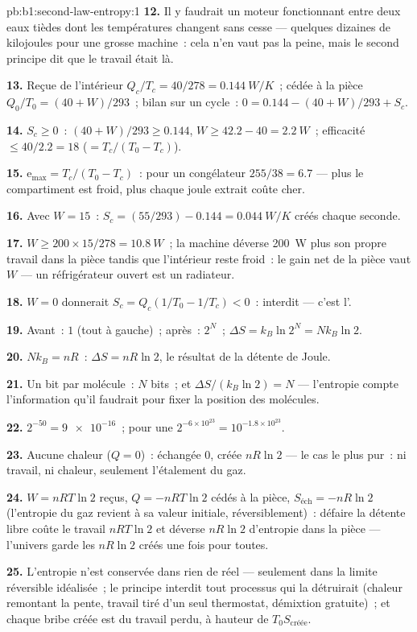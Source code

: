 \begin{solution}{pb:b1:second-law-entropy:1}
\textbf{12.} Il y faudrait un moteur fonctionnant entre deux eaux tièdes dont
les températures changent sans cesse --- quelques dizaines de kilojoules pour
une grosse machine~: cela n'en vaut pas la peine, mais le second principe dit
que le travail était là.

\textbf{13.} Reçue de l'intérieur $Q_c/T_c = 40/278 = \qty{0.144}{W/K}$~;
cédée à la pièce $Q_0/T_0 = (40 + W)/293$~; bilan sur un cycle~:
$0 = 0.144 - (40 + W)/293 + S_c$.

\textbf{14.} $S_c \geq 0$~: $(40 + W)/293 \geq 0.144$, $W \geq 42.2 - 40 =
\qty{2.2}{W}$~; efficacité $\leq 40/2.2 = 18$ ($= T_c/(T_0 - T_c)$).

\textbf{15.} $\mathrm{e}_{\max} = T_c/(T_0 - T_c)$~: pour un congélateur $255/38 = 6.7$
--- plus le compartiment est froid, plus chaque joule extrait coûte cher.

\textbf{16.} Avec $W = 15$~: $S_c = (55/293) - 0.144 = \qty{0.044}{W/K}$ créés
chaque seconde.

\textbf{17.} $W \geq 200 \times 15/278 = \qty{10.8}{W}$~; la machine déverse
\qty{200}{W} plus son propre travail dans la pièce tandis que l'intérieur
reste froid~: le gain net de la pièce vaut $W$ --- un réfrigérateur ouvert est un radiateur.

\textbf{18.} $W = 0$ donnerait $S_c = Q_c(1/T_0 - 1/T_c) < 0$~: interdit ---
c'est l'.

\textbf{19.} Avant~: $1$ (tout à gauche)~; après~: $2^N$~; $\Delta S = k_B\ln2^N =
Nk_B\ln2$.

\textbf{20.} $Nk_B = nR$~: $\Delta S = nR\ln2$, le résultat de la détente de Joule.

\textbf{21.} Un bit par molécule~: $N$ bits~; et $\Delta S/(k_B\ln2) = N$ ---
l'entropie compte l'information qu'il faudrait pour fixer la position des
molécules.

\textbf{22.} $2^{-50} = \num{9e-16}$~; pour une  $2^{-6\times10^{23}} =
10^{-1.8\times10^{23}}$.

\textbf{23.} Aucune chaleur ($Q = 0$)~: échangée $0$, créée $nR\ln2$ --- le cas
le plus pur~: ni travail, ni chaleur, seulement l'étalement du gaz.

\textbf{24.} $W = nRT\ln2$ reçus, $Q = -nRT\ln2$ cédés à la pièce,
$S_{\text{éch}} = -nR\ln2$ (l'entropie du gaz revient à sa valeur
initiale, réversiblement)~: défaire la détente libre coûte le travail $nRT\ln2$
et déverse $nR\ln2$ d'entropie dans la pièce --- l'univers garde les
$nR\ln2$ créés une fois pour toutes.

\textbf{25.} L'entropie n'est conservée dans rien de réel --- seulement dans
la limite réversible idéalisée~; le principe interdit tout processus qui la
détruirait (chaleur remontant la pente, travail tiré d'un seul thermostat,
démixtion gratuite)~; et chaque bribe créée est du travail perdu, à hauteur de $T_0S_{\text{créée}}$.
\end{solution}
